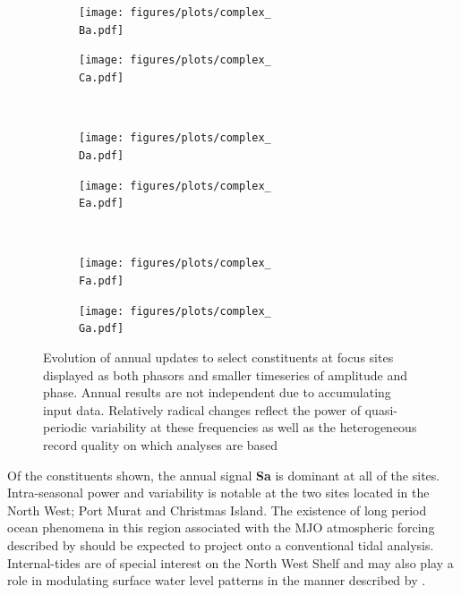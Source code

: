 \begin{figure}[H]\centering
    \begin{subfigure}[b]{\figwidthHalf}
        \texttt{[image: figures/plots/complex\_\\Ba.pdf]}\caption{\Bname{}}
    \end{subfigure}
    \begin{subfigure}[b]{\figwidthHalf}
        \texttt{[image: figures/plots/complex\_\\Ca.pdf]}\caption{\Cname{}}
    \end{subfigure} 
    \\
    \begin{subfigure}[b]{\figwidthHalf}
        \texttt{[image: figures/plots/complex\_\\Da.pdf]}\caption{\Dname{}}
    \end{subfigure}
    \begin{subfigure}[b]{\figwidthHalf}
        \texttt{[image: figures/plots/complex\_\\Ea.pdf]}\caption{\Ename{}}
    \end{subfigure}
    \\
    \begin{subfigure}[b]{\figwidthHalf}
        \texttt{[image: figures/plots/complex\_\\Fa.pdf]} \caption{\Fname{}}
    \end{subfigure}
    \begin{subfigure}[b]{\figwidthHalf}
        \texttt{[image: figures/plots/complex\_\\Ga.pdf]} \caption{\Gname{}}
    \end{subfigure}
    \caption{Evolution of annual updates to select constituents at focus sites displayed as both phasors and smaller timeseries of amplitude and phase.  Annual results are not independent due to accumulating input data. Relatively radical changes reflect the power of quasi-periodic variability at these frequencies as well as the heterogeneous record quality on which analyses are based} 
    \label{fig:complexEvolution}
\end{figure}   

Of the constituents shown, the annual signal \textbf{Sa} is dominant at all of the sites.
Intra-seasonal power and variability is notable at the two sites located in the North West; Port Murat and Christmas Island.   The existence of long period ocean phenomena in this region associated with the MJO atmospheric forcing described by \citeauthor{Maxime:2019jc} should be expected to project onto a conventional tidal analysis.   Internal-tides are of special interest on the North West Shelf \citep{10.3389/fmars.2021.629372} and may also play a role in  modulating surface water level patterns in the manner described by \citeauthor{Colosi:2006va}.


